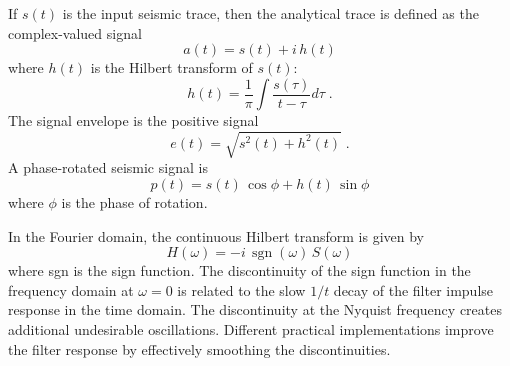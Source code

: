 If $s(t)$ is the input seismic trace, then the analytical trace is defined as the complex-valued signal 
\[
a(t) = s(t)+i\,h(t)
\]
where $h(t)$ is the Hilbert transform of $s(t)$:
\[
h(t) =\displaystyle \frac{1}{\pi} \int \frac{s(\tau)}{t-\tau} d\tau\;.
\]
The signal envelope is  the positive signal
\[
e(t)=\sqrt{s^2(t)+h^2(t)}\;.
\]
A phase-rotated seismic signal is 
\[
p(t)=s(t)\,\cos{\phi} +h(t)\,\sin{\phi}
\]
where $\phi$ is the phase of rotation.

In the Fourier domain, the continuous Hilbert transform is given by
\[
H(\omega) = -i\,\operatorname{sgn}(\omega)\,S(\omega)
\]
where sgn is the sign function. The discontinuity of the sign function in the frequency domain at $\omega=0$ is related to the slow $1/t$ decay of the filter impulse response in the time domain. The discontinuity at the Nyquist frequency creates additional undesirable oscillations. Different practical implementations improve the filter response by effectively smoothing the discontinuities.